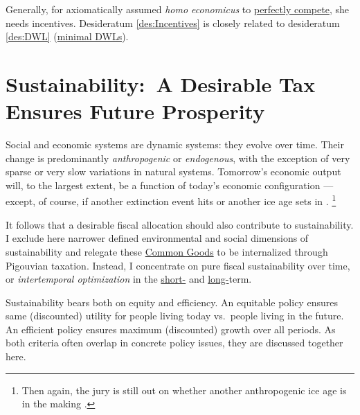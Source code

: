 Generally, for axiomatically assumed \emph{homo economicus} to \hyperref[sec:PerfectCompetition]{perfectly compete}, she needs incentives.
Desideratum \ref{des:Incentives} is closely related to desideratum \ref{des:DWL} (\hyperref[des:DWL]{minimal DWLs}).


\section[Sustainability]{Sustainability:~A Desirable Tax Ensures Future Prosperity}
	\label{sec:tax-sustainability}



Social and economic systems are dynamic systems:
they evolve over time.
Their change is predominantly \emph{anthropogenic} or \emph{endogenous}, with the exception of very sparse or very slow variations in natural systems.
Tomorrow's economic output will, to the largest extent, be a function of today's economic
configuration --- except, of course, if another extinction event hits or another ice age sets in \citep{Courtillot2002}.
\footnote{
	Then again, the jury is still out on whether another anthropogenic ice age is in the making \citep{UnitedNations2007, Rahmsdorf-2009}.
}


It follows that a desirable fiscal allocation should also contribute to sustainability.
I exclude here narrower defined environmental and social dimensions of sustainability and relegate these \hyperref[CommonGIcood]{Common Goods} to be internalized through Pigouvian taxation.
Instead, I concentrate on pure fiscal sustainability over time, or \emph{intertemporal optimization} in the \hyperref[ShortTermSmoothing]{short-} and \hyperref[LongTermSmoothing]{long-}term.

Sustainability bears both on equity and efficiency.
An equitable policy ensures same (discounted) utility for people living today vs.\ people living in the future.
An efficient policy ensures maximum (discounted) growth over all periods.
As both criteria often overlap in concrete policy issues, they are discussed together here.

